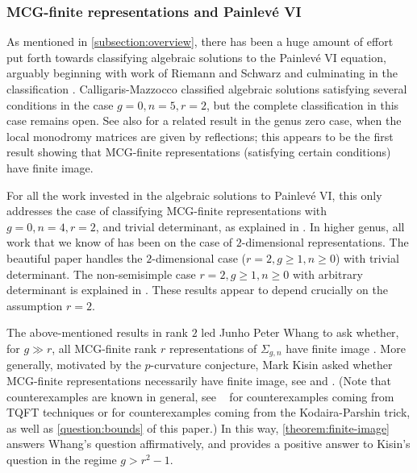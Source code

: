 \subsubsection{MCG-finite representations and Painlev\'e VI}
\label{subsubsection:prior-mcg-finite}
As mentioned in \autoref{subsection:overview}, there has been a huge amount of effort put forth towards classifying algebraic solutions to the Painlev\'e VI equation, arguably beginning with work of Riemann \cite{riemann1857beitrage} and Schwarz \cite{schwarz1873ueber}
and culminating in the classification \cite{lisovyy2014algebraic}.
Calligaris-Mazzocco \cite{calligaris2018finite} classified algebraic
solutions satisfying several conditions in the case $g=0, n=5, r=2$, but the complete classification in
this case remains open. See also \cite{michel-hurwitz} for a related result in the genus zero case, when the local monodromy matrices are given by reflections; this appears to be the first result showing that MCG-finite representations (satisfying certain conditions) have finite image.

For all the work invested in the algebraic solutions to Painlev\'e VI, this only
addresses the case of classifying  MCG-finite representations with $g = 0, n = 4,
r = 2$, and trivial determinant, as explained in \cite{lisovyy2014algebraic}.
In higher genus, all work that we know of has been on the case of
$2$-dimensional representations.
The beautiful paper \cite{biswas2017surface} handles the $2$-dimensional case ($r = 2, g \geq 1, n \geq 0$) with trivial
determinant.
The non-semisimple case $r = 2, g \geq 1, n \geq 0$ with arbitrary determinant
is explained in \cite[Theorem B]{CH:isomonodromic}.
These results appear to depend crucially on the assumption $r=2$.

\begin{remark}
\notready
	\label{remark:}
	The above-mentioned results in rank $2$ led Junho Peter Whang to ask whether, for $g\gg r$, all MCG-finite rank $r$ representations of $\Sigma_{g,n}$
have finite image \cite[Question 1.5.3]{lawrence2019representations}.
More generally, motivated by the $p$-curvature conjecture, Mark Kisin asked whether MCG-finite representations
necessarily have finite image,
see \cite[p. 3]{biswas2017surface} and \cite[p. 1]{sinz:thesis}. (Note that
counterexamples are known in general, see ~\cite[Theorem
5.1]{biswas2018representations} for counterexamples coming from TQFT techniques or
\cite[Example 3.3.1]{lawrence2019representations} for counterexamples coming
from the Kodaira-Parshin trick, as well as
\autoref{question:bounds} of this paper.)
In this way, \autoref{theorem:finite-image} answers Whang's question
affirmatively, and provides a positive answer to Kisin's question in the regime
$g > r^2-1$.
\end{remark}

